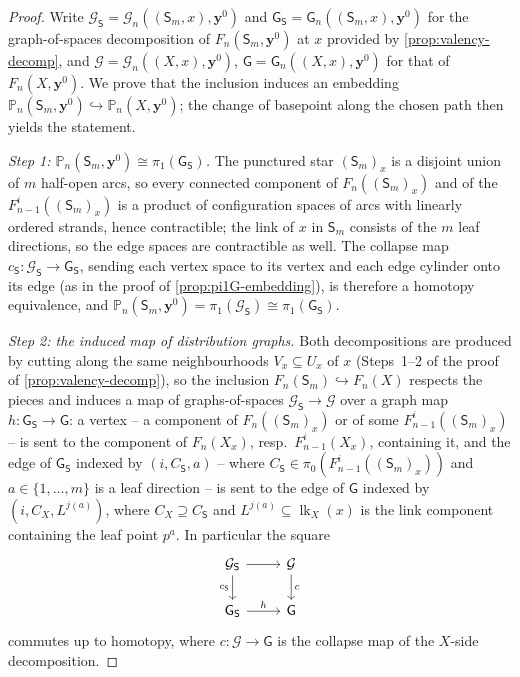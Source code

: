 \documentclass[reqno]{amsart}
\theoremstyle{definition}
\newcommand\bfy{\mathbf{y}}
\newcommand\cG{\mathcal{G}}
\newcommand\sfG{\mathsf{G}}
\newcommand\sfS{\mathsf{S}}
\newcommand{\PB}{\mathbb{P}}
\DeclareMathOperator{\lk}{lk}
\numberwithin{equation}{section}
\begin{document}
\begin{proof}
Write \(\cG_\sfS=\cG_n((\sfS_m,x),\bfy^0)\) and
\(\sfG_\sfS=\sfG_n((\sfS_m,x),\bfy^0)\) for the graph-of-spaces
decomposition of \(F_n(\sfS_m,\bfy^0)\) at \(x\) provided by
\cref{prop:valency-decomp}, and \(\cG=\cG_n((X,x),\bfy^0)\),
\(\sfG=\sfG_n((X,x),\bfy^0)\) for that of \(F_n(X,\bfy^0)\). We
prove that the inclusion induces an embedding
\(\PB_n(\sfS_m,\bfy^0)\hookrightarrow\PB_n(X,\bfy^0)\); the change
of basepoint along the chosen path then yields the statement.

\smallskip
\noindent\emph{Step 1: \(\PB_n(\sfS_m,\bfy^0)\cong\pi_1(\sfG_\sfS)\).}
The punctured star \((\sfS_m)_x\) is a disjoint union of \(m\)
half-open arcs, so every connected component of
\(F_n((\sfS_m)_x)\) and of the \(F^i_{n-1}((\sfS_m)_x)\) is a
product of configuration spaces of arcs with linearly ordered
strands, hence contractible; the link of \(x\) in \(\sfS_m\)
consists of the \(m\) leaf directions, so the edge spaces are
contractible as well. The collapse map
\(c_\sfS\colon\cG_\sfS\to\sfG_\sfS\), sending each vertex space to its
vertex and each edge cylinder onto its edge (as in the proof of
\cref{prop:pi1G-embedding}), is therefore a homotopy equivalence,
and \(\PB_n(\sfS_m,\bfy^0)=\pi_1(\cG_\sfS)\cong\pi_1(\sfG_\sfS)\).

\smallskip
\noindent\emph{Step 2: the induced map of distribution graphs.}
Both decompositions are produced by cutting along the same
neighbourhoods \(V_x\subseteq U_x\) of \(x\) (Steps~1--2 of the
proof of \cref{prop:valency-decomp}), so the inclusion
\(F_n(\sfS_m)\hookrightarrow F_n(X)\) respects the pieces and
induces a map of graphs-of-spaces \(\cG_\sfS\to\cG\) over a graph map
\(h\colon\sfG_\sfS\to\sfG\): a vertex -- a component of
\(F_n((\sfS_m)_x)\) or of some \(F^i_{n-1}((\sfS_m)_x)\) -- is sent
to the component of \(F_n(X_x)\), resp.\ \(F^i_{n-1}(X_x)\),
containing it, and the edge of \(\sfG_\sfS\) indexed by
\((i,C_\sfS,a)\) -- where \(C_\sfS\in\pi_0(F^i_{n-1}((\sfS_m)_x))\) and
\(a\in\{1,\dots,m\}\) is a leaf direction -- is sent to the edge of
\(\sfG\) indexed by \((i,C_X,L^{j(a)})\), where \(C_X\supseteq C_\sfS\)
and \(L^{j(a)}\subseteq\lk_X(x)\) is the link component containing
the leaf point \(p^a\). In particular the square
\[
\begin{tikzcd}
\cG_\sfS \arrow[r] \arrow[d,"c_\sfS"'] & \cG \arrow[d,"c"] \\
\sfG_\sfS \arrow[r,"h"] & \sfG
\end{tikzcd}
\]
commutes up to homotopy, where \(c\colon\cG\to\sfG\) is the
collapse map of the \(X\)-side decomposition.


\end{proof}
\end{document}
